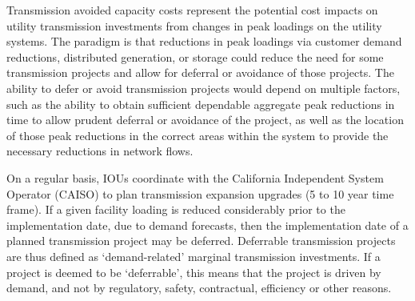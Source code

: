 \documentclass[11pt]{article}
\begin{document}
Transmission avoided capacity costs represent the potential cost impacts on utility transmission investments from changes in peak loadings on the utility systems. The paradigm is that reductions in peak loadings via customer demand reductions, distributed generation, or storage could reduce the need for some transmission projects and allow for deferral or avoidance of those projects. The ability to defer or avoid transmission projects would depend on multiple factors, such as the ability to obtain sufficient dependable aggregate peak reductions in time to allow prudent deferral or avoidance of the project, as well as the location of those peak reductions in the correct areas within the system to provide the necessary reductions in network flows.

\bigskip

On a regular basis, IOUs coordinate with the California Independent System Operator (CAISO) to plan transmission expansion upgrades (5 to 10 year time frame). If a given facility loading is reduced considerably prior to the implementation date, due to demand forecasts, then the implementation date of a planned transmission project may be deferred. Deferrable transmission projects are thus defined as  `demand-related' marginal  transmission investments. If a project is deemed to be `deferrable', this means that the  project is driven by demand, and not by regulatory, safety, contractual, efficiency or other reasons. 
\end{document}
